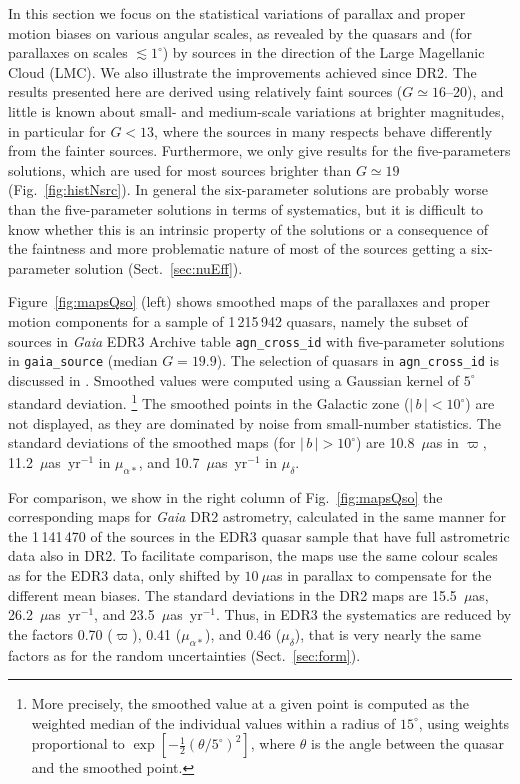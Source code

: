 \documentclass[longauth]{aa} %
\newcommand{\gacs}[1]{{\footnotesize\texttt{#1}}}
\begin{document}
In this section we focus on the statistical variations of parallax and proper motion
biases on various angular scales, as revealed by the quasars and (for parallaxes on
scales $\lesssim 1^\circ$) by sources in the direction of the Large Magellanic Cloud
(LMC). We also illustrate the improvements achieved since DR2. The results presented here 
are derived using relatively faint sources ($G\simeq 16$--20), and little is known about 
small- and medium-scale variations at brighter magnitudes, in particular for $G<13$, 
where the sources in many respects behave differently from the fainter sources. Furthermore, 
we only give results for the five-parameters solutions, which are used for most 
sources brighter than $G\simeq 19$ (Fig.~\ref{fig:histNsrc}). 
In general the six-parameter solutions are probably worse than the five-parameter 
solutions in terms of systematics, but it is difficult to know whether this is an intrinsic 
property of the solutions or a consequence of the faintness and more problematic 
nature of most of the sources getting a six-parameter solution (Sect.~\ref{sec:nuEff}). 

Figure~\ref{fig:mapsQso} (left) shows smoothed maps of the parallaxes and proper motion
components for a sample of 1\,215\,942 quasars, namely the subset of sources in 
\textit{Gaia} EDR3 Archive table \gacs{agn\_cross\_id} with five-parameter 
solutions in \gacs{gaia\_source} (median $G=19.9$).
The selection of quasars in \gacs{agn\_cross\_id} is discussed in \citet{EDR3-DPACP-133}.
Smoothed values were computed using a Gaussian kernel of $5^\circ$ standard deviation.%
\footnote{More precisely, the smoothed value at a given point is computed as
the weighted median of the individual values within a radius of $15^\circ$, using
weights proportional to $\exp[-\frac{1}{2}(\theta/5^\circ)^2]$, where $\theta$ is 
the angle between the quasar and the smoothed point.}
The smoothed points in the Galactic zone ($|\,b\,|<10^\circ$) are not displayed, 
as they are dominated by noise from small-number statistics. The standard 
deviations of the smoothed maps (for $|\,b\,|>10^\circ$) are 10.8~$\mu$as in 
$\varpi$, 11.2~$\mu$as~yr$^{-1}$ in $\mu_{\alpha*}$, and 10.7~$\mu$as~yr$^{-1}$
in $\mu_\delta$.

For comparison, we show in the right column of Fig.~\ref{fig:mapsQso} the corresponding 
maps for \textit{Gaia} DR2 astrometry, calculated in the same manner for the 1\,141\,470 of the
sources in the EDR3 quasar sample that have full astrometric data also in DR2. To facilitate 
comparison, the maps use the same colour scales as for the EDR3 data, only shifted by 
$10~\mu$as in parallax to compensate for the different mean
biases. The standard deviations in the DR2 maps are 15.5~$\mu$as,  
26.2~$\mu$as~yr$^{-1}$, and 23.5~$\mu$as~yr$^{-1}$. Thus, in EDR3 the systematics
are reduced by the factors 0.70 ($\varpi$), 0.41 ($\mu_{\alpha*}$), and 0.46 ($\mu_\delta$), 
that is very nearly the same factors as for the random uncertainties (Sect.~\ref{sec:form}).
\end{document}
